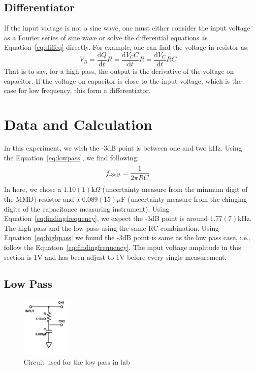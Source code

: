 \documentclass[aps,prl,reprint]{revtex4-1}
\newcommand{\de}{\mathrm{d}}
\begin{document}
    \subsection{Differentiator}
        If the input voltage is not a sine wave, one must either consider the input voltage as a Fourier series of sine wave or solve the differential equations as Equation~\ref{eq:diffeq} directly. For example, one can find the voltage in resistor as:
        \[
        V_R = \frac{\de Q}{\de t}R = \frac{\de V_CC}{\de t}R = \frac{\de V_C}{\de t}RC
        \]
        That is to say, for a high pass, the output is the derivative of the voltage on capacitor. If the voltage on capacitor is close to the input voltage, which is the case for low frequency, this form a differentiator.
\section{Data and Calculation}
    In this experiment, we wish the -3dB point is between one and two kHz. Using the Equation~\ref{eq:lowpass}, we find following:
    \begin{equation}
        f_\text{-3\text{dB}} = \frac{1}{2\pi RC} \label{eq:findingfrequency}
    \end{equation}
    In here, we chose a $1.10(1)\text{k}\Omega$ (uncertainty measure from the minmum digit of the MMD) resistor and a $0.089(15)\mu$F (uncertainty measure from the chinging digits of the capacitance measuring instrument). Using Equation~\ref{eq:findingfrequency}, we expect the -3dB point is around $1.77(7)$kHz. The high pass and the low pass using the same RC combination. Using Equation~\ref{eq:highpass} we found the -3dB point is same as the low pass case, i.e., follow the Equation~\ref{eq:findingfrequency}. The input voltage amplitude in this section is 1V and has been adjust to 1V before every single measurement.

    \subsection{Low Pass}
        \begin{figure}[h]
            \centering
            \includegraphics[width=1in]{image/lowpasslab.pdf}
            \caption{Circuit used for the low pass in lab}
            \label{fig:lowpasslab}
        \end{figure}
\end{document}
